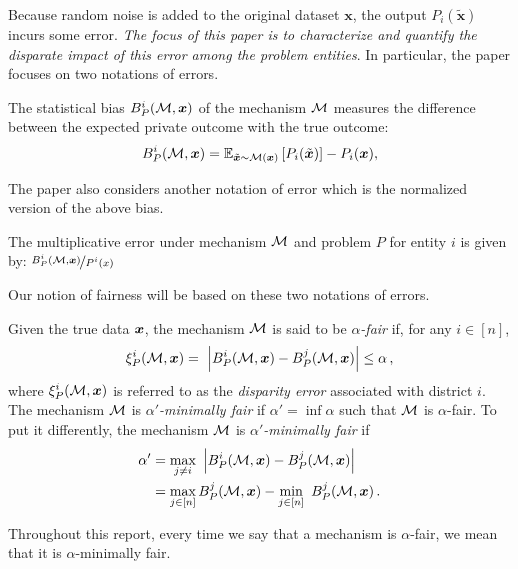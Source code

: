 Because random noise is added to the original dataset $\bm{x}$, the output $P_i(\tilde{\bm{x}})$ incurs some error. {\em The focus of this paper is to characterize and quantify the disparate impact of this error among the problem entities}. In particular, the paper focuses on two notations of errors.

\begin{definition}
	\label{def:bias}
	The statistical bias  $ B_P^i(\mathcal{M}, \bm{x}) $ of the mechanism $\mathcal{M}$ measures the difference between the expected private outcome with the true outcome:
	\begin{equation}
		\label{eq:bias}
		B_P^i(\mathcal{M}, \bm{x}) =
		\mathbb{E}_{\tilde{\bm{x}} \sim \mathcal{M}(\bm{x})} \left[ P_i(\tilde{\bm{x}}) \right] - P_i (\bm{x}),
	\end{equation}

\end{definition}

The paper also considers another notation of error which is the normalized version of the above bias.
\begin{definition}
	The multiplicative error under mechanism $\mathcal{M}$ and problem $P$ for entity $i$ is given by: $\nicefrac{B_P^i(\mathcal{M}, \bm{x})}{P^i(x)}$

\end{definition}

Our notion of fairness will be based on these two notations of errors.


\begin{definition}
	Given the true data $\bm{x}$, the mechanism $\mathcal{M}$ is said to be \emph{$\alpha$-fair} if, for any $i\in[n]$,
	\begin{equation*}
		\xi^{i}_P(\mathcal{M}, \bm{x}) = ~\left\vert  B_P^i(\mathcal{M}, \bm{x}) - B_P^j(\mathcal{M}, \bm{x})
		\right\vert\leq \alpha\,,
	\end{equation*}
	where $ \xi^{i}_P(\mathcal{M}, \bm{x})$ is referred to as the \emph{disparity error} associated with
	district $i$. The mechanism $\mathcal{M}$ is \emph{$\alpha'$-minimally fair} if $\alpha'=\inf \alpha$ such that
	$\mathcal{M}$ is $\alpha$-fair. To put it differently, the mechanism $\mathcal{M}$ is \emph{$\alpha'$-minimally fair} if
	\begin{align*}
		\alpha'& = \max_{j\neq i}~\left\vert  B_P^i(\mathcal{M}, \bm{x}) - B_P^j(\mathcal{M}, \bm{x})
		\right\vert \\
		&= \max_{j\in [n]} B_P^j(\mathcal{M}, \bm{x})   -\min_{j\in [n]}~ B_P^j(\mathcal{M}, \bm{x}) \,.
	\end{align*}
\end{definition}
Throughout this report, every time we say that a mechanism is $\alpha$-fair, we mean that
it is $\alpha$-minimally fair.

